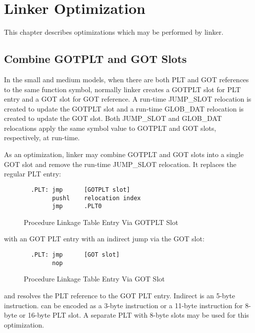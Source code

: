 \chapter{Linker Optimization}

This chapter describes optimizations which may be performed by linker.

\section{Combine GOTPLT and GOT Slots}
In the small and medium models, when there are both PLT and GOT references
to the same function symbol, normally linker creates a GOTPLT slot for PLT
entry and a GOT slot for GOT reference.  A run-time JUMP_SLOT relocation is
created to update the GOTPLT slot and a run-time GLOB_DAT relocation is
created to update the GOT slot.  Both JUMP_SLOT and GLOB_DAT relocations
apply the same symbol value to GOTPLT and GOT slots, respectively, at
run-time.

As an optimization, linker may combine GOTPLT and GOT slots into a single
GOT slot and remove the run-time JUMP_SLOT relocation.  It replaces the
regular PLT entry:

\begin{figure}[H]
\Hrule
\caption{Procedure Linkage Table Entry Via GOTPLT Slot}
\label{gotplt_plt}
\begin{footnotesize}
\begin{verbatim}
  .PLT: jmp      [GOTPLT slot]
        pushl    relocation index
        jmp      .PLT0
\end{verbatim}
\end{footnotesize}
\Hrule
\end{figure}

\noindent
with an GOT PLT entry with an indirect jump via the GOT slot:
\indent

\begin{figure}[H]
\Hrule
\caption{Procedure Linkage Table Entry Via GOT Slot}
\label{got_plt}
\begin{footnotesize}
\begin{verbatim}
  .PLT: jmp      [GOT slot]
        nop
\end{verbatim}
\end{footnotesize}
\Hrule
\end{figure}

\noindent
and resolves the PLT reference to the GOT PLT entry.  Indirect 
is an 5-byte instruction.   can be encoded as a 3-byte
instruction or a 11-byte instruction for 8-byte or 16-byte PLT slot.
A separate PLT with 8-byte slots may be used for this optimization.
\indent

